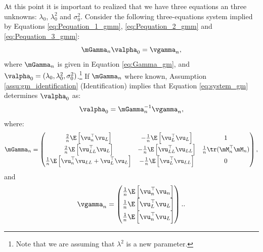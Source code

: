 \documentclass[english,12pt]{book}\usepackage[]{graphicx}\usepackage[]{xcolor}
\begin{document}
At this point it is important to realized that we have three equations an three unknowns: $\lambda_0$, $\lambda^2_0$ and $\sigma^2_0$. Consider the following three-equations system implied by Equations \eqref{eq:Pequation_1_gmm}, \eqref{eq:Pequation_2_gmm} and \eqref{eq:Pequation_3_gmm}:
\begin{equation}\label{eq:system_gm}
  \mGamma_n\valpha_0  = \vgamma_n,
\end{equation}
%
where $\mGamma_n$ is given in Equation \eqref{eq:Gamma_gm}, and $\valpha_0 = (\lambda_0, \lambda^2_0, \sigma^2_0)$.\footnote{Note that we are assuming that $\lambda^2$ is a new parameter.} If $\mGamma_n$ where known, Assumption \ref{assu:gm_identification} (Identification) implies that Equation \eqref{eq:system_gm} determines $\valpha_0$ as:
\begin{equation*}
\valpha_0 = \mGamma_n^{-1}\vgamma_n,
\end{equation*}
%
where:
\begin{equation}\label{eq:Gamma_gm}
  \mGamma_n = \begin{pmatrix}
   \frac{2}{n}\E\left[\vu^\top_n\vu_L\right] & -\frac{1}{n}\E\left[\vu_L^\top\vu_L\right] & 1 \\
   \frac{2}{n}\E\left[\vu^\top_{LL}\vu_L\right] & -\frac{1}{n}\E\left[\vu_{LL}^\top\vu_{LL}\right] & \frac{1}{n} \tr(\mM^\top_n\mM_n)\\
   \frac{1}{n}\E\left[\vu^\top_n\vu_{LL} + \vu_L^\top\vu_L\right] & -\frac{1}{n}\E\left[\vu_{L}^\top\vu_{LL}\right] & 0
        \end{pmatrix},
\end{equation}
%
and
\begin{equation}
  \vgamma_n = \begin{pmatrix}
  \frac{1}{n}\E\left[\vu^\top_n\vu_n\right] \\
  \frac{1}{n}\E\left[\vu^\top_L\vu_L\right] \\
  \frac{1}{n}\E\left[\vu^\top_n\vu_L\right]
        \end{pmatrix}..
\end{equation}
\end{document}
